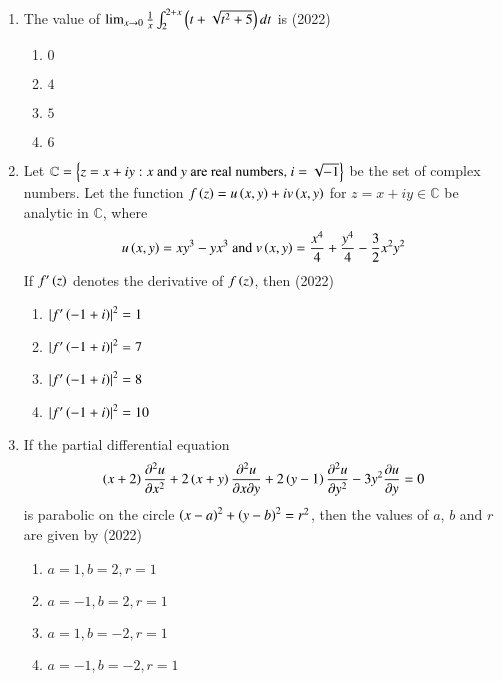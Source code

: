 \documentclass[journal]{IEEEtran}
\begin{document}
\begin{enumerate}
\item The value of $\lim_{x\rightarrow 0}\frac{1}{x}\int_{2}^{2+x}\left(t+\sqrt{t^{2}+5}\right)dt$ is \hfill(2022)
\begin{multicols}{2}
\begin{enumerate}
\item $0$
\item $4$
\item $5$
\item $6$
\end{enumerate}
\end{multicols}


\item Let $\mathbb{C}=\left\{z=x+iy:x\text{ and }y\text{ are real numbers, }i=\sqrt{-1}\right\}$ be the set of complex numbers. Let the function $f\left(z\right)=u\left(x,y\right)+iv\left(x,y\right)$ for $z=x+iy\in\mathbb{C}$ be analytic in $\mathbb{C}$, where $$u\left(x,y\right)=xy^{3}-yx^{3}\text{ and }v\left(x,y\right)=\frac{x^{4}}{4}+\frac{y^{4}}{4}-\frac{3}{2}x^{2}y^{2}$$ If $f^{\prime}\left(z\right)$ denotes the derivative of $f\left(z\right)$, then \hfill(2022)
\begin{multicols}{2}
\begin{enumerate}
\item $\left\vert f^{\prime}\left(-1+i\right)\right\vert^{2}=1$
\item $\left\vert f^{\prime}\left(-1+i\right)\right\vert^{2}=7$
\item $\left\vert f^{\prime}\left(-1+i\right)\right\vert^{2}=8$
\item $\left\vert f^{\prime}\left(-1+i\right)\right\vert^{2}=10$
\end{enumerate}
\end{multicols}


\item If the partial differential equation $$\left(x+2\right)\frac{\partial^{2}u}{\partial x^{2}}+2\left(x+y\right)\frac{\partial^{2}u}{\partial x\partial y}+2\left(y-1\right)\frac{\partial^{2}u}{\partial y^{2}}-3y^{2}\frac{\partial u}{\partial y}=0$$ is parabolic on the circle $\left(x-a\right)^{2}+\left(y-b\right)^{2}=r^{2}$, then the values of $a$, $b$ and $r$ are given by \hfill(2022)
\begin{multicols}{2}
\begin{enumerate}
\item $a=1,b=2,r=1$
\item $a=-1,b=2,r=1$
\item $a=1,b=-2,r=1$
\item $a=-1,b=-2,r=1$
\end{enumerate}
\end{multicols}
\end{enumerate}
\end{document}
